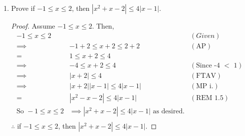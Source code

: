 \documentclass[a4paper]{article}
\begin{document}
\begin{flushleft}
\begin{enumerate}
            \item
            Prove if $-1\leq x \leq 2$, then $|x^2+x-2|\leq 4|x-1|$.
            \begin{proof}
                Assume $-1\leq x \leq 2$.
                Then, 
                \begin{align*}
                    -1\leq x \leq 2 & & (Given) \\
                    \implies& -1 + 2 \leq x + 2\leq 2 + 2 & (\text{AP}) \\
                    =& 1 \leq x + 2\leq 4 & \\
                    \implies& -4 \leq x + 2\leq 4 & (\text{Since -4 $<$ 1}) \\
                    \implies& |x+2| \leq 4 & (\text{FTAV}) \\
                    \implies& |x+2||x-1| \leq 4|x-1| & (\text{MP i.})\\
                    = &|x^2-x-2| \leq 4|x-1| & (\text{REM 1.5}) \\
                    \text{So } -1\leq x \leq 2 &\implies |x^2+x-2|\leq 4|x-1| \text{ as desired.} \\
                \end{align*}
                $\therefore$ if $-1\leq x \leq 2$, then $|x^2+x-2|\leq 4|x-1|$.
            \end{proof}


\end{enumerate}
\end{flushleft}
\end{document}
